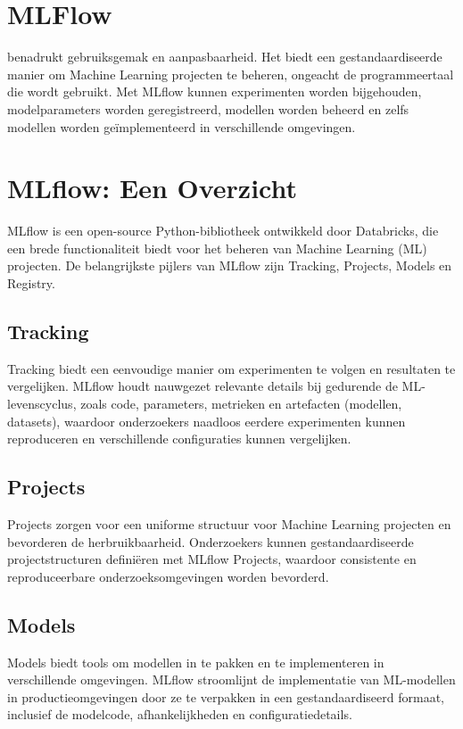 \section{MLFlow}

\textcite{MLflow2023} benadrukt gebruiksgemak en aanpasbaarheid. Het biedt een gestandaardiseerde manier om Machine Learning projecten te beheren, ongeacht de programmeertaal die wordt gebruikt. Met MLflow kunnen experimenten worden bijgehouden, modelparameters worden geregistreerd, modellen worden beheerd en zelfs modellen worden geïmplementeerd in verschillende omgevingen.

\section{MLflow: Een Overzicht}

MLflow is een open-source Python-bibliotheek ontwikkeld door Databricks, die een brede functionaliteit biedt voor het beheren van Machine Learning (ML) projecten. De belangrijkste pijlers van MLflow zijn Tracking, Projects, Models en Registry.

\subsection{Tracking}
Tracking biedt een eenvoudige manier om experimenten te volgen en resultaten te vergelijken. MLflow houdt nauwgezet relevante details bij gedurende de ML-levenscyclus, zoals code, parameters, metrieken en artefacten (modellen, datasets), waardoor onderzoekers naadloos eerdere experimenten kunnen reproduceren en verschillende configuraties kunnen vergelijken.

\subsection{Projects}
Projects zorgen voor een uniforme structuur voor Machine Learning projecten en bevorderen de herbruikbaarheid. Onderzoekers kunnen gestandaardiseerde projectstructuren definiëren met MLflow Projects, waardoor consistente en reproduceerbare onderzoeksomgevingen worden bevorderd.

\subsection{Models}
Models biedt tools om modellen in te pakken en te implementeren in verschillende omgevingen. MLflow stroomlijnt de implementatie van ML-modellen in productieomgevingen door ze te verpakken in een gestandaardiseerd formaat, inclusief de modelcode, afhankelijkheden en configuratiedetails.

